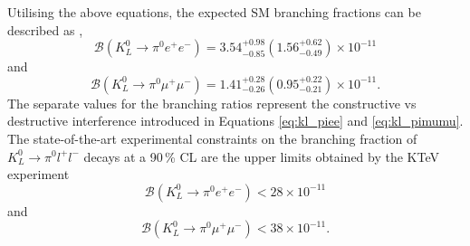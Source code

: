 \documentclass[../main.tex]{subfiles}
\begin{document}
    Utilising the above equations, the expected SM branching fractions can be described as \cite{Mescia:2006jd},
    \begin{equation}
        \mathcal{B}(K^0_L \to \pi^0 e^+e^-) = 3.54^{+0.98}_{-0.85}(1.56^{+0.62}_{-0.49}) \times 10^{-11}
    \end{equation}  
    and 
    \begin{equation}
        \mathcal{B}(K^0_L \to \pi^0 \mu^+\mu^-) = 1.41^{+0.28}_{-0.26} (0.95^{+0.22}_{-0.21}) \times 10^{-11}.
    \end{equation}
    The separate values for the branching ratios represent the constructive vs destructive interference introduced in Equations \ref{eq:kl_piee} and \ref{eq:kl_pimumu}.  
    The state-of-the-art experimental constraints on the branching fraction of $K^0_L \to \pi^0 l^+l^-$ decays at a 90\,\% \gls{CL} are the upper limits obtained by the KTeV experiment \cite{PhysRevLett.93.021805, PhysRevLett.84.5279} 
    \begin{equation}
        \mathcal{B}(K^0_L \to \pi^0 e^+e^-) < 28 \times 10^{-11}
    \end{equation}  
    and 
    \begin{equation}
        \mathcal{B}(K^0_L \to \pi^0 \mu^+\mu^-) < 38 \times 10^{-11}.
    \end{equation}
\end{document}
